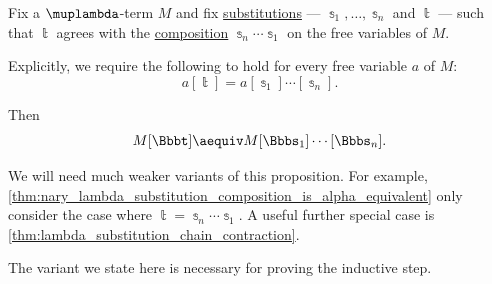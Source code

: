 \begin{proposition}\label{thm:nary_lambda_substitution_composition_match_is_alpha_equivalent}
  Fix a \( \muplambda \)-term \( M \) and fix \hyperref[def:atomic_lambda_term_substitution]{substitutions} --- \( \Bbbs_1, \ldots, \Bbbs_n \) and \( \Bbbt \) --- such that \( \Bbbt \) agrees with the \hyperref[def:lambda_substitution_composition]{composition} \( \Bbbs_n \cdots \Bbbs_1 \) on the free variables of \( M \).

  Explicitly, we require the following to hold for every free variable \( a \) of \( M \):
  \begin{equation*}
    a[\Bbbt] = a[\Bbbs_1] \cdots [\Bbbs_n].
  \end{equation*}

  Then
  \begin{equation}\label{eq:thm:nary_lambda_substitution_composition_match_is_alpha_equivalent}
    M[\Bbbt] \aequiv M[\Bbbs_1] \cdots [\Bbbs_n].
  \end{equation}
\end{proposition}
\begin{comments}
  \item We will need much weaker variants of this proposition. For example, \cref{thm:nary_lambda_substitution_composition_is_alpha_equivalent} only consider the case where \( \Bbbt = \Bbbs_n \cdots \Bbbs_1 \). A useful further special case is \cref{thm:lambda_substitution_chain_contraction}.

  The variant we state here is necessary for proving the inductive step.
\end{comments}
